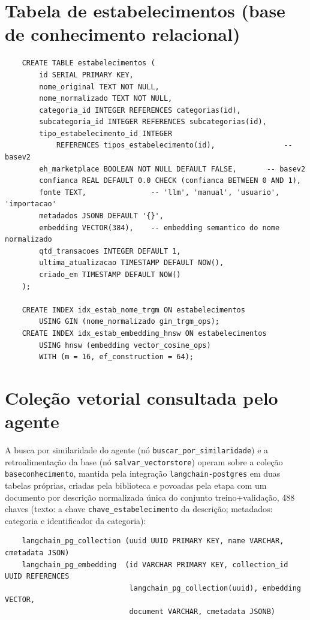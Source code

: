 \begin{apendicesenv}
\section{Tabela de estabelecimentos (base de conhecimento relacional)}
{\footnotesize
\begin{verbatim}
	CREATE TABLE estabelecimentos (
		id SERIAL PRIMARY KEY,
		nome_original TEXT NOT NULL,
		nome_normalizado TEXT NOT NULL,
		categoria_id INTEGER REFERENCES categorias(id),
		subcategoria_id INTEGER REFERENCES subcategorias(id),
		tipo_estabelecimento_id INTEGER
		    REFERENCES tipos_estabelecimento(id),                -- basev2
		eh_marketplace BOOLEAN NOT NULL DEFAULT FALSE,       -- basev2
		confianca REAL DEFAULT 0.0 CHECK (confianca BETWEEN 0 AND 1),
		fonte TEXT,               -- 'llm', 'manual', 'usuario', 'importacao'
		metadados JSONB DEFAULT '{}',
		embedding VECTOR(384),    -- embedding semantico do nome normalizado
		qtd_transacoes INTEGER DEFAULT 1,
		ultima_atualizacao TIMESTAMP DEFAULT NOW(),
		criado_em TIMESTAMP DEFAULT NOW()
	);

	CREATE INDEX idx_estab_nome_trgm ON estabelecimentos
	    USING GIN (nome_normalizado gin_trgm_ops);
	CREATE INDEX idx_estab_embedding_hnsw ON estabelecimentos
	    USING hnsw (embedding vector_cosine_ops)
	    WITH (m = 16, ef_construction = 64);
\end{verbatim}
}

\section{Coleção vetorial consultada pelo agente}

A busca por similaridade do agente (nó \texttt{buscar\_por\_similaridade}) e a retroalimentação da base (nó \texttt{salvar\_vectorstore}) operam sobre a coleção \texttt{baseconhecimento}, mantida pela integração \texttt{langchain-postgres} em duas tabelas próprias, criadas pela biblioteca e povoadas pela etapa  com um documento por descrição normalizada única do conjunto treino+validação, 488 chaves (texto: a chave \texttt{chave\_estabelecimento} da descrição; metadados: categoria e identificador da categoria):

{\footnotesize
\begin{verbatim}
	langchain_pg_collection (uuid UUID PRIMARY KEY, name VARCHAR, cmetadata JSON)
	langchain_pg_embedding  (id VARCHAR PRIMARY KEY, collection_id UUID REFERENCES
	                         langchain_pg_collection(uuid), embedding VECTOR,
	                         document VARCHAR, cmetadata JSONB)
\end{verbatim}
}


\end{apendicesenv}
